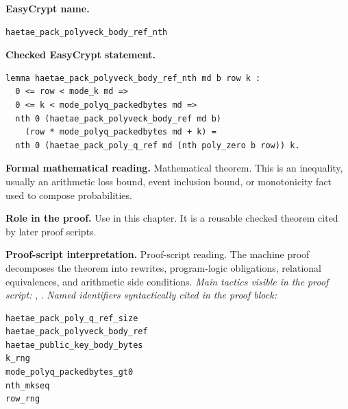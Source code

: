 \begin{formaltheorem}
\noindent\textbf{EasyCrypt name.}
\begin{lstlisting}[language=EasyCrypt,basicstyle=\ttfamily\scriptsize]
haetae_pack_polyveck_body_ref_nth
\end{lstlisting}
\noindent\textbf{Checked EasyCrypt statement.}
\begin{lstlisting}[language=EasyCrypt,basicstyle=\ttfamily\scriptsize]
lemma haetae_pack_polyveck_body_ref_nth md b row k :
  0 <= row < mode_k md =>
  0 <= k < mode_polyq_packedbytes md =>
  nth 0 (haetae_pack_polyveck_body_ref md b)
    (row * mode_polyq_packedbytes md + k) =
  nth 0 (haetae_pack_poly_q_ref md (nth poly_zero b row)) k.
\end{lstlisting}
\noindent\textbf{Formal mathematical reading.}
Mathematical theorem. This is an inequality, usually an arithmetic loss bound, event inclusion bound, or monotonicity fact used to compose probabilities.

\noindent\textbf{Role in the proof.}
Use in this chapter. It is a reusable checked theorem cited by later proof scripts.

\noindent\textbf{Proof-script interpretation.}
Proof-script reading. The machine proof decomposes the theorem into rewrites, program-logic obligations, relational equivalences, and arithmetic side conditions.
\emph{Main tactics visible in the proof script:} , .
\emph{Named identifiers syntactically cited in the proof block:}
\begin{lstlisting}[language=EasyCrypt,basicstyle=\ttfamily\scriptsize]
haetae_pack_poly_q_ref_size
haetae_pack_polyveck_body_ref
haetae_public_key_body_bytes
k_rng
mode_polyq_packedbytes_gt0
nth_mkseq
row_rng
\end{lstlisting}

\end{formaltheorem}

